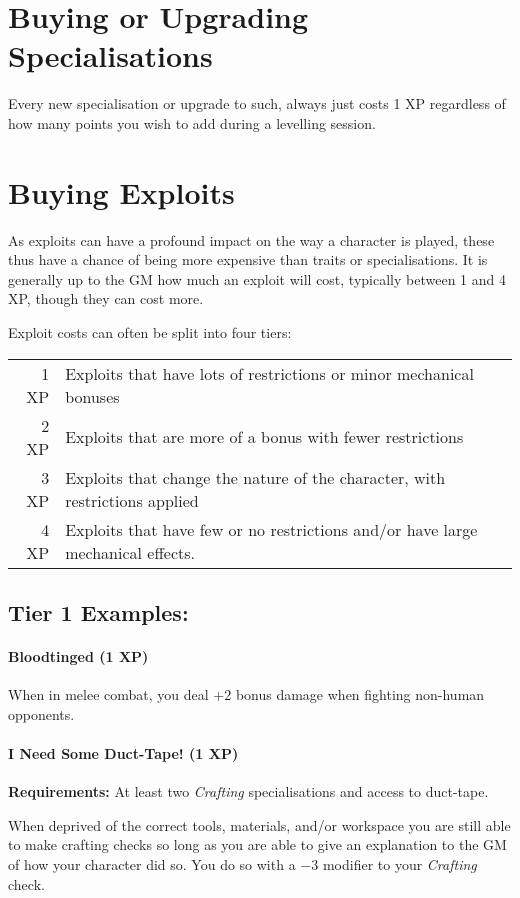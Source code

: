 \section{Buying or Upgrading Specialisations}
Every new specialisation or upgrade to such, always just costs 1 XP regardless of how many points you wish to add during a levelling session.

\section{Buying Exploits}
As exploits can have a profound impact on the way a character is played, these thus have a chance of being more expensive than traits or specialisations.
It is generally up to the GM how much an exploit will cost, typically between 1 and 4 XP, though they can cost more.

Exploit costs can often be split into four tiers:

\begin{tabular}{r | l}
  1 XP & Exploits that have lots of restrictions or minor mechanical bonuses\\
  2 XP & Exploits that are more of a bonus with fewer restrictions\\
  3 XP & Exploits that change the nature of the character, with restrictions applied\\
  4 XP & Exploits that have few or no restrictions and/or have large mechanical effects.
\end{tabular}

\subsection{Tier 1 Examples:}
\paragraph{Bloodtinged (1 XP)}
When in melee combat, you deal $+2$ bonus damage when fighting non-human opponents.

\paragraph{I Need Some Duct-Tape! (1 XP)}
\textbf{Requirements:} At least two \textit{Crafting} specialisations and access to duct-tape.

When deprived of the correct tools, materials, and/or workspace you are still able to make crafting checks so long as you are able to give an explanation to the GM of how your character did so.
You do so with a $-3$ modifier to your \textit{Crafting} check.

